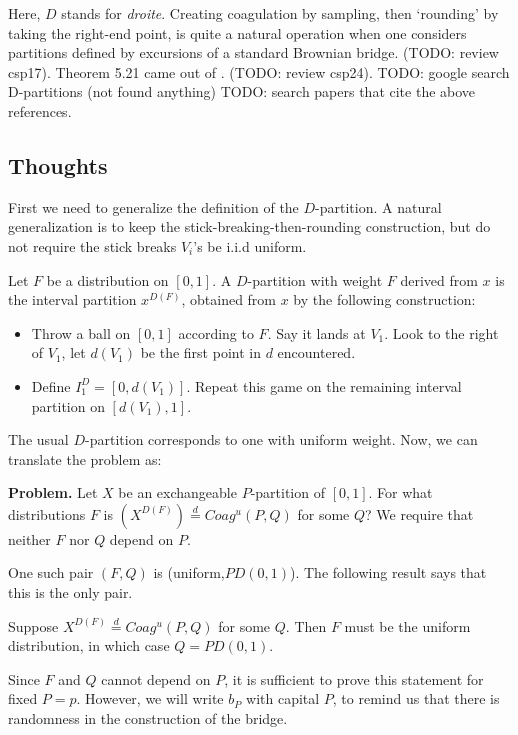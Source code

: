 Here, $D$ stands for \emph{droite}. Creating coagulation by sampling, then `rounding' by taking the right-end point, is quite a natural operation when one considers partitions defined by excursions of a standard Brownian bridge. (TODO: review csp17). Theorem 5.21 came out of \cite{csp24}. (TODO: review csp24). 
TODO: google search D-partitions (not found anything)
TODO: search papers that cite the above references.

\subsection{Thoughts} %

First we need to generalize the definition of the $D$-partition. A natural generalization is to keep the stick-breaking-then-rounding construction, but do not require the stick breaks $V_i$'s be i.i.d uniform. 

\begin{definition}
Let $F$ be a distribution on $[0,1]$. A $D$-partition with weight $F$ derived from $x$ is the interval partition $x^{D(F)}$, obtained from $x$ by the following construction: 
\begin{itemize}
  \item Throw a ball on $[0,1]$ according to $F$. Say it lands at $V_1$. Look to the right of $V_1$, let $d(V_1)$ be the first point in $d$ encountered. 
  \item Define $I^D_1 = [0,d(V_1)]$. Repeat this game on the remaining interval partition on $[d(V_1), 1]$. 
\end{itemize}
\end{definition}
The usual $D$-partition corresponds to one with uniform weight. Now, we can translate the problem as:

\textbf{Problem.} Let $X$ be an exchangeable $P$-partition of $[0,1]$. For what distributions $F$ is $(X^{D(F)}) \stackrel{d}{=} Coag^u(P, Q)$ for some $Q$? We require that neither $F$ nor $Q$ depend on $P$. 

One such pair $(F,Q)$ is (uniform,$PD(0,1)$). The following result says that this is the only pair.

\begin{theorem}\label{thm:543}
Suppose $X^{D(F)} \stackrel{d}{=} Coag^u(P, Q)$ for some $Q$. Then $F$ must be the uniform distribution, in which case $Q = PD(0,1)$. 
\end{theorem}

Since $F$ and $Q$ cannot depend on $P$, it is sufficient to prove this statement for fixed $P = p$. However, we will write $b_P$ with capital $P$, to remind us that there is randomness in the construction of the bridge.

